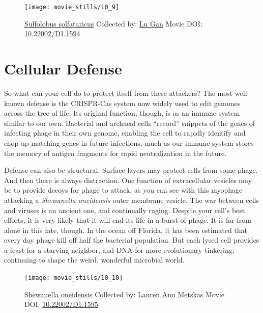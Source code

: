 \documentclass[]{tufte-book}
\begin{document}
\begin{figure}
\texttt{[image: movie\_stills/10\_9]} \caption[\protect\hyperlink{tree}{Sulfolobus solfataricus} Collected
by: \protect\hyperlink{lu_gan}{Lu Gan} Movie DOI:
\href{https://doi.org/10.22002/D1.1594}{10.22002/D1.1594}]{\protect\hyperlink{tree}{Sulfolobus solfataricus} Collected
by: \protect\hyperlink{lu_gan}{Lu Gan} Movie DOI:
\href{https://doi.org/10.22002/D1.1594}{10.22002/D1.1594}}\label{fig:10-9}
\end{figure}

\section{Cellular Defense}\label{cellular-defense}

So what can your cell do to protect itself from these attackers? The
most well-known defense is the CRISPR-Cas system now widely used to edit
genomes across the tree of life. Its original function, though, is as an
immune system similar to our own. Bacterial and archaeal cells
``record'' snippets of the genes of infecting phage in their own genome,
enabling the cell to rapidly identify and chop up matching genes in
future infections, much as our immune system stores the memory of
antigen fragments for rapid neutralization in the future.

Defense can also be structural. Surface layers may protect cells from
some phage. And then there is always distraction. One function of
extracellular vesicles may be to provide decoys for phage to attack, as
you can see with this myophage attacking a \emph{Shewanella oneidensis}
outer membrane vesicle. The war between cells and viruses is an ancient
one, and continually raging. Despite your cell's best efforts, it is
very likely that it will end its life in a burst of phage. It is far
from alone in this fate, though. In the ocean off Florida, it has been
estimated that every day phage kill off half the bacterial population.
But each lysed cell provides a feast for a starving neighbor, and DNA
for more evolutionary tinkering, continuing to shape the weird,
wonderful microbial world.





\begin{figure}
\texttt{[image: movie\_stills/10\_10]} \caption[\protect\hyperlink{tree}{Shewanella oneidensis} Collected
by: \protect\hyperlink{lauren_ann_metskas}{Lauren Ann Metskas} Movie
DOI: \href{https://doi.org/10.22002/D1.1595}{10.22002/D1.1595}]{\protect\hyperlink{tree}{Shewanella oneidensis} Collected
by: \protect\hyperlink{lauren_ann_metskas}{Lauren Ann Metskas} Movie
DOI: \href{https://doi.org/10.22002/D1.1595}{10.22002/D1.1595}}\label{fig:10-10}
\end{figure}
\end{document}
